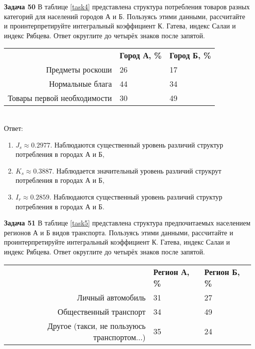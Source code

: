\documentclass{article}
\begin{document}
\textbf{Задача 50} В таблице \ref{task4} представлена структура потребления товаров разных категорий для населений городов А и Б. Пользуясь этими данными, рассчитайте и проинтерпретируйте интегральный коэффициент К. Гатева, индекс Салаи и индекс Рябцева. Ответ округлите до четырёх знаков после запятой.\\

\begin{minipage}{\textwidth}
\centering
\begin{tabularx}{0.7\textwidth}{rYY}
\toprule
 & \textbf{Город А, \%} & \textbf{Город Б, \%} \\
\cmidrule(lr){2-2}\cmidrule(lr){3-3}
Предметы роскоши & 26 & 17 \\

Нормальные блага & 44 & 34 \\

Товары первой необходимости & 30 & 49 \\
\bottomrule
\end{tabularx}
\label{task4}
\end{minipage} \\[35pt]

Ответ: \begin{enumerate}
\item $J_s\approx 0.2977$. Наблюдаются существенный уровень различий структур потребления в городах А и Б,
\item $K_s\approx 0.3887$. Наблюдается значительный уровень различий струкрут потребления в городах А и Б,
\item $I_r\approx 0.2859$. Наблюдаются существенный уровень различий структур потребления в городах А и Б.
\end{enumerate}

\textbf{Задача 51} В таблице \ref{task5} представлена структура предпочитаемых населением регионов А и Б видов транспорта. Пользуясь этими данными, рассчитайте и проинтерпретируйте интегральный коэффициент К. Гатева, индекс Салаи и индекс Рябцева. Ответ округлите до четырёх знаков после запятой.\\

\begin{minipage}{\textwidth}
\centering
\begin{tabularx}{0.7\textwidth}{rYY}
\toprule
 & \textbf{Регион А, \%} & \textbf{Регион Б, \%} \\
\cmidrule(lr){2-2}\cmidrule(lr){3-3}
Личный автомобиль & 31 & 27 \\

Общественный транспорт & 34 & 49 \\

Другое (такси, не пользуюсь транспортом...) & 35 & 24 \\
\bottomrule
\end{tabularx}
\label{task4}
\end{minipage} \\[35pt]
\end{document}
